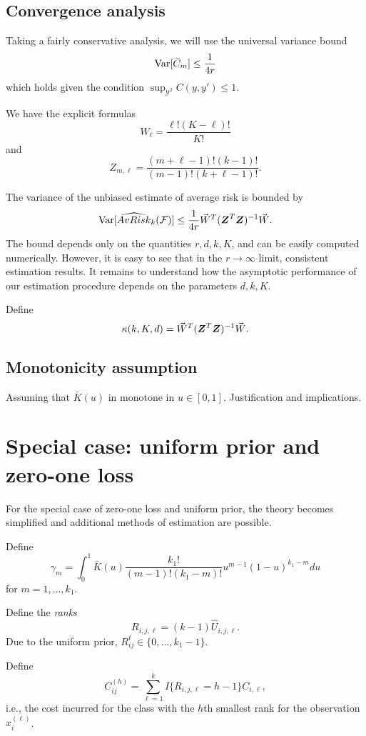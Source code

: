 \documentclass[12pt]{article}
\begin{document}
\subsection{Convergence analysis}



Taking a fairly conservative analysis, we will use the universal variance bound
\[
\text{Var}[\bar{C}_m] \leq \frac{1}{4r}
\]
which holds given the condition $\sup_{\mathcal{Y}^2} C(y, y') \leq 1.$

We have the explicit formulas
\[
W_\ell = \frac{\ell!(K-\ell)!}{K!}
\]
and
\[
Z_{m, \ell} = \frac{(m+\ell-1)!(k-1)!}{(m-1)!(k+\ell-1)!}.
\]

The variance of the unbiased estimate of average risk is bounded by
\[
\text{Var}[\widehat{AvRisk}_k(\mathcal{F})] \leq \frac{1}{4r} \vec{W}^T (\boldsymbol{Z}^T \boldsymbol{Z})^{-1} \vec{W}.
\]
The bound depends only on the quantities $r, d, k, K$, and can be
easily computed numerically.  However, it is easy to see that in the
$r \to \infty$ limit, consistent estimation results.  It remains to
understand how the asymptotic performance of our estimation procedure
depends on the parameters $d, k, K$.

Define
\[
\kappa(k, K, d) = \vec{W}^T (\boldsymbol{Z}^T \boldsymbol{Z})^{-1} \vec{W}.
\]


\subsection{Monotonicity assumption}

Assuming that $\bar{K}(u)$ in monotone in $u \in [0,1]$.
Justification and implications.

\section{Special case: uniform prior and zero-one loss}\label{sec:sp_case}

For the special case of zero-one loss and uniform prior, the theory
becomes simplified and additional methods of estimation are possible.

Define
\[
\gamma_m = \int_0^1 \bar{K}(u)  \frac{k_1!}{(m-1)!(k_1-m)!} u^{m-1} (1-u)^{k_1-m} du
\]
for $m = 1,\hdots, k_1$.

Define the \emph{ranks}
\[
R_{i, j, \ell} = (k-1)\hat{U}_{i, j, \ell}.
\]
Due to the uniform prior, $R_{ij}^\ell \in \{0,\hdots, k_1-1\}$.

Define
\[
C_{ij}^{(h)} = \sum_{\ell=1}^k I\{R_{i, j, \ell} = h - 1\} C_{i, \ell},
\]
i.e., the cost incurred for the class with the $h$th smallest rank for
the observation $x_i^{(\ell)}$.
\end{document}

